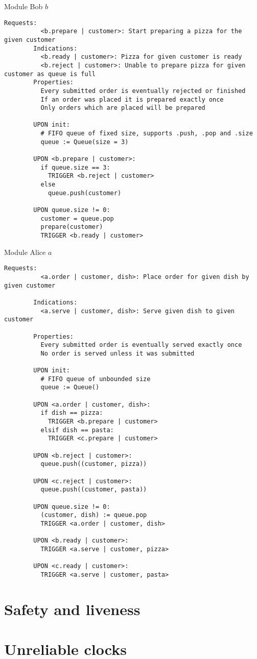 \documentclass[a4paper]{scrreprt}
\begin{document}
\begin{library}{Module Bob $b$}
        \begin{lstlisting}[mathescape=true,autogobble=true,breaklines=true]
		Requests:
		  <b.prepare | customer>: Start preparing a pizza for the given customer
		Indications:
		  <b.ready | customer>: Pizza for given customer is ready
		  <b.reject | customer>: Unable to prepare pizza for given customer as queue is full
		Properties:
		  Every submitted order is eventually rejected or finished
		  If an order was placed it is prepared exactly once
		  Only orders which are placed will be prepared

		UPON init:
		  # FIFO queue of fixed size, supports .push, .pop and .size
		  queue := Queue(size = 3)

		UPON <b.prepare | customer>:
		  if queue.size == 3:
		    TRIGGER <b.reject | customer>
		  else
		    queue.push(customer)

		UPON queue.size != 0:
		  customer = queue.pop
		  prepare(customer)
		  TRIGGER <b.ready | customer>
        \end{lstlisting}
\end{library}

\begin{library}{Module Alice $a$}
        \begin{lstlisting}[mathescape=true,autogobble=true,breaklines=true]
		Requests:
		  <a.order | customer, dish>: Place order for given dish by given customer
		  
		Indications:
		  <a.serve | customer, dish>: Serve given dish to given customer

		Properties:
		  Every submitted order is eventually served exactly once
		  No order is served unless it was submitted

		UPON init:
		  # FIFO queue of unbounded size
		  queue := Queue()

		UPON <a.order | customer, dish>:
		  if dish == pizza:
		    TRIGGER <b.prepare | customer>
		  elsif dish == pasta:
		    TRIGGER <c.prepare | customer>

		UPON <b.reject | customer>:
		  queue.push((customer, pizza))

		UPON <c.reject | customer>:
		  queue.push((customer, pasta))

		UPON queue.size != 0:
		  (customer, dish) := queue.pop
		  TRIGGER <a.order | customer, dish>

		UPON <b.ready | customer>:
		  TRIGGER <a.serve | customer, pizza>

		UPON <c.ready | customer>:
		  TRIGGER <a.serve | customer, pasta>
        \end{lstlisting}
\end{library}

\section{Safety and liveness}

\section{Unreliable clocks}
\end{document}
